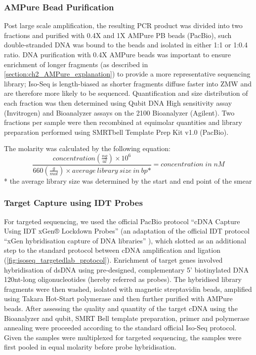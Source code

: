 \subsubsection{AMPure Bead Purification} 
Post large scale amplification, the resulting PCR product was divided into two fractions and purified with 0.4X and 1X AMPure PB beads (PacBio), such double-stranded DNA was bound to the beads and isolated in either 1:1 or 1:0.4 ratio. DNA purification with 0.4X AMPure beads was important to ensure enrichment of longer fragments (as described in \cref{section:ch2_AMPure_explanation}) to provide a more representative sequencing library; Iso-Seq is length-biased as shorter fragments diffuse faster into ZMW and are therefore more likely to be sequenced. Quantification and size distribution of each fraction was then determined using Qubit DNA High sensitivity assay (Invitrogen) and Bioanalyzer assays on the 2100 Bioanalyzer (Agilent). Two fractions per sample were then recombined at equimolar quantities and library preparation performed using SMRTbell Template Prep Kit v1.0 (PacBio). 

The molarity was calculated by the following equation: 
\begin{equation}
	\label{eqn:isoseq_library_molarity}
	\frac{concentration(\frac{ng}{ul})\times 10^6}{660(\frac{g}{mol}) \times average\:library\:size\:in\:bp\mbox{*}} = concentration\;in\; nM
\end{equation}
* the average library size was determined by the start and end point of the smear

\subsubsection{Target Capture using IDT Probes} 
\label{section:ch2_targetcapture_explanation} 
For targeted sequencing, we used the official PacBio protocol “cDNA Capture Using IDT
xGen® Lockdown Probes” (an adaptation of the official IDT protocol “xGen hybridisation capture of DNA libraries” ), which slotted as an additional step to the standard protocol between cDNA amplification and ligation (\cref{fig:isoseq_targetedlab_protocol}). Enrichment of target genes involved hybridisation of dsDNA using pre-designed, complementary 5’ biotinylated DNA 120nt-long oligonucleotides (hereby referred as probes). The hybridised library fragments were then washed, isolated with magnetic streptavidin beads, amplified using Takara Hot-Start polymerase and then further purified with AMPure beads. After assessing the quality and quantity of the target cDNA using the Bioanalyzer and qubit, SMRT Bell template preparation, primer and polymerase annealing were proceeded according to the standard official Iso-Seq protocol. Given the samples were multiplexed for targeted sequencing, the samples were first pooled in equal molarity before probe hybridisation.  

